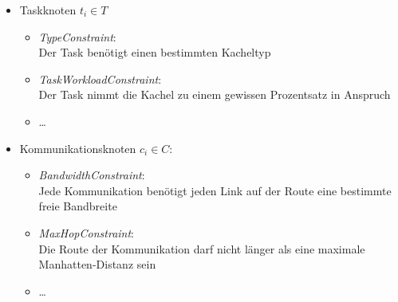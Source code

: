 \begin{itemize}
\item Taskknoten $t_i\in T$
\begin{itemize}
\item \textit{TypeConstraint}: \\
Der Task benötigt einen bestimmten Kacheltyp
\item \textit{TaskWorkloadConstraint}: \\
Der Task nimmt die  Kachel zu einem gewissen Prozentsatz in Anspruch
\item \dots 
\label{Taskknoten}
\end{itemize}
\item Kommunikationsknoten $c_i \in C$:
\begin{itemize}
\item \textit{BandwidthConstraint}: \\
Jede Kommunikation benötigt jeden Link auf der Route eine bestimmte freie Bandbreite
\item \textit{MaxHopConstraint}: \\
Die Route der Kommunikation darf nicht länger als eine maximale Manhatten-Distanz sein
\item \dots
\label{Kommunikationsknoten}
\end{itemize}

\label{Randbedingungen}

\end{itemize}

